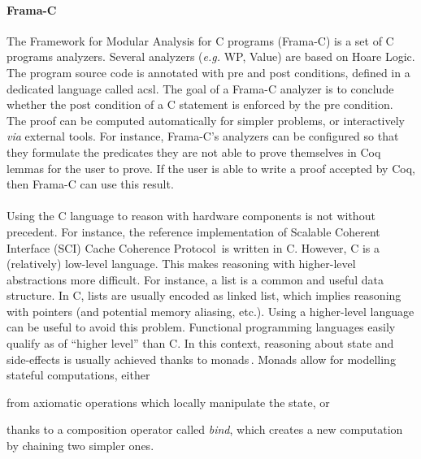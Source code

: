 \paragraph{Frama-C}
%
The Framework for Modular Analysis for C programs (Frama-C) is a set of C
programs analyzers.
%
Several analyzers (\emph{e.g.} WP, Value) are based on Hoare Logic.
%
The program source code is annotated with pre and post conditions, defined in a
dedicated language called \ac{acsl}.
%
The goal of a Frama-C analyzer is to conclude whether the post condition of a C
statement is enforced by the pre condition.
%
The proof can be computed automatically for simpler problems, or interactively
\emph{via} external tools.
%
For instance, Frama-C's analyzers can be configured so that they formulate the
predicates they are not able to prove themselves in Coq lemmas for the user to
prove.
%
If the user is able to write a proof accepted by Coq, then Frama-C can use this
result.

\paragraph{}
%
Using the C language to reason with hardware components is not without
precedent.
%
For instance, the reference implementation of Scalable Coherent Interface (SCI)
Cache Coherence Protocol\,\cite{stern1995cachecoherence} is written in C.
%
However, C is a (relatively) low-level language.
%
This makes reasoning with higher-level abstractions more difficult.
%
For instance, a list is a common and useful data structure.
%
In C, lists are usually encoded as linked list, which implies reasoning with
pointers (and potential memory aliasing, etc.).
%
Using a higher-level language can be useful to avoid this problem.
%
Functional programming languages easily qualify as of ``higher level'' than C.
%
In this context, reasoning about state and side-effects is usually achieved
thanks to monads\,\cite{jones2005io}.
%
Monads allow for modelling stateful computations, either \begin{inparaenum}[(1)]
%
\item from axiomatic operations which locally manipulate the state, or
%
\item thanks to a composition operator called \emph{bind}, which creates a new
  computation by chaining two simpler ones.
%
\end{inparaenum}

